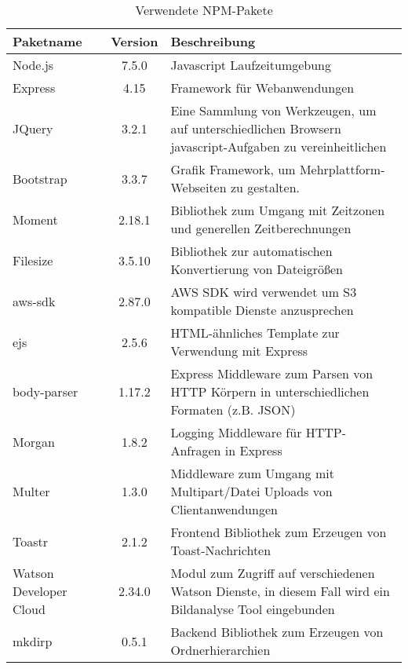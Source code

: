 \begin{table}
	\centering
		\begin{tabular}{ l | c | p{8cm}}
			\hline
			Paketname & Version & Beschreibung \\ \hline
			Node.js & 7.5.0 & Javascript Laufzeitumgebung \\
			Express & 4.15 & Framework für Webanwendungen \\
			JQuery & 3.2.1 & Eine Sammlung von Werkzeugen, um auf unterschiedlichen Browsern javascript-Aufgaben zu vereinheitlichen \\
			Bootstrap & 3.3.7 & Grafik Framework, um Mehrplattform-Webseiten zu gestalten. \\
			Moment & 2.18.1 & Bibliothek zum Umgang mit Zeitzonen und generellen Zeitberechnungen \\
			Filesize & 3.5.10 & Bibliothek zur automatischen Konvertierung von Dateigrößen \\
			aws-sdk & 2.87.0 & AWS SDK wird verwendet um S3 kompatible Dienste anzusprechen \\
			ejs & 2.5.6 & HTML-ähnliches Template zur Verwendung mit Express \\
			body-parser & 1.17.2 & Express Middleware zum Parsen von HTTP Körpern in unterschiedlichen Formaten (z.B. JSON)\\
			Morgan & 1.8.2 & Logging Middleware für HTTP-Anfragen in Express \\
			Multer & 1.3.0 & Middleware zum Umgang mit Multipart/Datei Uploads von Clientanwendungen \\
			Toastr & 2.1.2 & Frontend Bibliothek zum Erzeugen von Toast-Nachrichten \\
			Watson Developer Cloud & 2.34.0 & Modul zum Zugriff auf verschiedenen Watson Dienste, in diesem Fall wird ein Bildanalyse Tool eingebunden \\
			mkdirp & 0.5.1 & Backend Bibliothek zum Erzeugen von Ordnerhierarchien
		\end{tabular}
		\caption{Verwendete NPM-Pakete}
		\label{tab:npmpackages}
\end{table}
